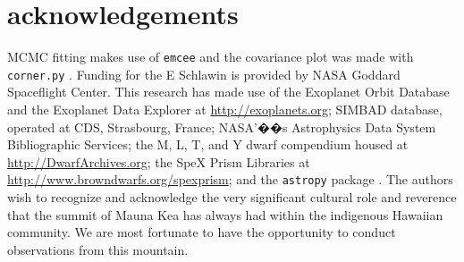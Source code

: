 \documentclass{aastex62}
\begin{document}


\acknowledgments

\section*{acknowledgements}
MCMC fitting makes use of \texttt{emcee} \citep{foreman-mackey2013emcee} and the covariance plot was made with \texttt{corner.py} \citep{foremanCorner}.
Funding for the E Schlawin is provided by NASA Goddard Spaceflight Center.
This research has made
use of the Exoplanet Orbit Database and the Exoplanet Data Explorer at \url{http://exoplanets.org}; SIMBAD database, operated at CDS, Strasbourg,
France; NASA'��s Astrophysics Data System Bibliographic
Services; the M, L, T, and Y dwarf compendium
housed at \url{http://DwarfArchives.org}; the SpeX Prism
Libraries at \url{http://www.browndwarfs.org/spexprism}; and the \texttt{astropy} package \citep{astropy2013}. 
The authors wish to recognize and acknowledge the very significant cultural role and reverence that the summit of Mauna Kea has always had within the indigenous Hawaiian community. We are most fortunate to have the opportunity to conduct observations from this mountain.

%

\vspace{5mm}

\end{document}
